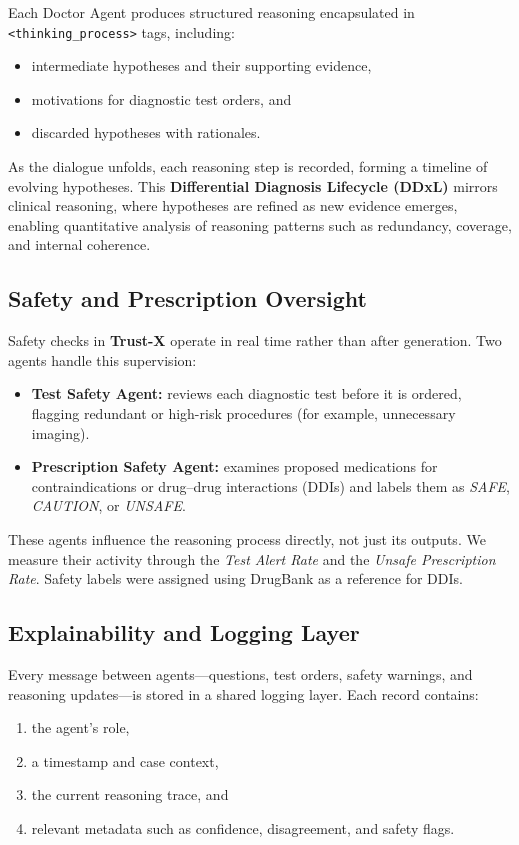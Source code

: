 \documentclass[letterpaper]{article} %
\begin{document}
Each Doctor Agent produces structured reasoning encapsulated in \texttt{<thinking\_process>} tags, including:
\begin{itemize}
    \item intermediate hypotheses and their supporting evidence,
    \item motivations for diagnostic test orders, and
    \item discarded hypotheses with rationales.
\end{itemize}
As the dialogue unfolds, each reasoning step is recorded, forming a timeline of evolving hypotheses. This \textbf{Differential Diagnosis Lifecycle (DDxL)} mirrors clinical reasoning, where hypotheses are refined as new evidence emerges, enabling quantitative analysis of reasoning patterns such as redundancy, coverage, and internal coherence.

\subsection{Safety and Prescription Oversight}

Safety checks in \textbf{Trust-X} operate in real time rather than after generation.  
Two agents handle this supervision:
\begin{itemize}
    \item \textbf{Test Safety Agent:} reviews each diagnostic test before it is ordered, flagging redundant or high-risk procedures (for example, unnecessary imaging).
    \item \textbf{Prescription Safety Agent:} examines proposed medications for contraindications or drug–drug interactions (DDIs) and labels them as \textit{SAFE}, \textit{CAUTION}, or \textit{UNSAFE}.
\end{itemize}
These agents influence the reasoning process directly, not just its outputs.  
We measure their activity through the \textit{Test Alert Rate} and the \textit{Unsafe Prescription Rate}.  
Safety labels were assigned using DrugBank \cite{wishart2018drugbank} as a reference for DDIs.

\subsection{Explainability and Logging Layer}

Every message between agents—questions, test orders, safety warnings, and reasoning updates—is stored in a shared logging layer.  
Each record contains:
\begin{enumerate}
    \item the agent’s role,
    \item a timestamp and case context,
    \item the current reasoning trace, and
    \item relevant metadata such as confidence, disagreement, and safety flags.
\end{enumerate}
\end{document}
